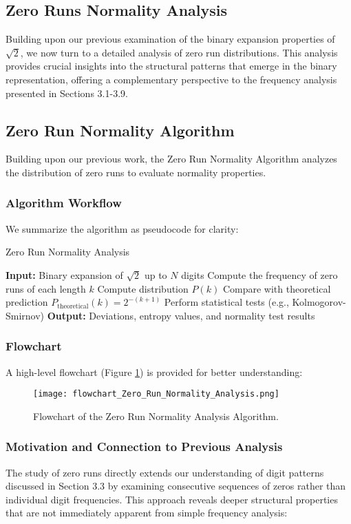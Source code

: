 \subsection{Zero Runs Normality Analysis}

Building upon our previous examination of the binary expansion properties of $\sqrt{2}$, we now turn to a detailed analysis of zero run distributions. This analysis provides crucial insights into the structural patterns that emerge in the binary representation, offering a complementary perspective to the frequency analysis presented in Sections 3.1-3.9.

\subsection{Zero Run Normality Algorithm}
Building upon our previous work, the Zero Run Normality Algorithm analyzes the distribution of zero runs to evaluate normality properties.

\subsubsection{Algorithm Workflow}
We summarize the algorithm as pseudocode for clarity:

\begin{algorithm}[H]
\caption{Zero Run Normality Analysis}
\begin{algorithmic}[1]
\State \textbf{Input:} Binary expansion of $\sqrt{2}$ up to $N$ digits
\State Compute the frequency of zero runs of each length $k$
    \State Compute distribution $P(k)$
    \State Compare with theoretical prediction $P_{\text{theoretical}}(k) = 2^{-(k+1)}$
\EndFor
\State Perform statistical tests (e.g., Kolmogorov-Smirnov)
\State \textbf{Output:} Deviations, entropy values, and normality test results
\end{algorithmic}
\end{algorithm}

\subsubsection{Flowchart}
A high-level flowchart (Figure \ref{fig:normality_flowchart}) is provided for better understanding:

\begin{figure}[H]
    \centering
    \texttt{[image: flowchart\_Zero\_Run\_Normality\_Analysis.png]}
    \caption{Flowchart of the Zero Run Normality Analysis Algorithm.}
    \label{fig:normality_flowchart}
\end{figure}\subsubsection{Motivation and Connection to Previous Analysis}
The study of zero runs directly extends our understanding of digit patterns discussed in Section 3.3 by examining consecutive sequences of zeros rather than individual digit frequencies. This approach reveals deeper structural properties that are not immediately apparent from simple frequency analysis:

